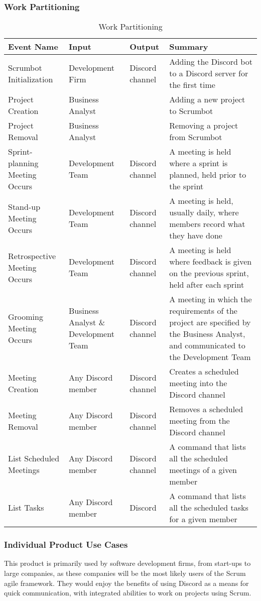 \documentclass[12pt, titlepage]{article}
\begin{document}
\subsubsection{Work Partitioning}
\begin{longtable}{|L{4cm}|L{3cm}|L{1.5cm}|L{6cm}|}
    \caption{Work Partitioning}
    \label{tab:my_label}\\
    \hline
    Event Name & Input & Output & Summary \\
    \hline
    Scrumbot Initialization & Development Firm & Discord channel & Adding the Discord bot to a Discord server for the first time\\
    \hline
    Project Creation & Business Analyst & & Adding a new project to Scrumbot\\
    \hline
    Project Removal & Business Analyst & & Removing a project from Scrumbot\\
    \hline
    Sprint-planning Meeting Occurs & Development Team & Discord channel & A meeting is held where a sprint is planned, held prior to the sprint\\
    \hline
    Stand-up Meeting Occurs & Development Team & Discord channel & A meeting is held, usually daily, where members record what they have done\\
    \hline
    Retrospective Meeting Occurs & Development Team & Discord channel & A meeting is held where feedback is given on the previous sprint, held after each sprint\\
    \hline
    Grooming Meeting Occurs & Business Analyst \& Development Team & Discord channel & A meeting in which the requirements of the project are specified by the Business Analyst, and communicated to the Development Team\\
    \hline
    Meeting Creation & Any Discord member & Discord channel & Creates a scheduled meeting into the Discord channel\\
    \hline
    Meeting Removal & Any Discord member & Discord channel & Removes a scheduled meeting from the Discord channel\\
    \hline
    List Scheduled Meetings & Any Discord member & Discord channel & A command that lists all the scheduled meetings of a given member\\
    \hline
    List Tasks & Any Discord member & Discord & A command that lists all the scheduled tasks for a given member\\
    \hline
\end{longtable}

\subsubsection{Individual Product Use Cases}
This product is primarily used by software development firms, from start-ups to large companies, as these companies will be the most likely users of the Scrum agile framework. They would enjoy the benefits of using Discord as a means for quick communication, with integrated abilities to work on projects using Scrum.\\
\end{document}
